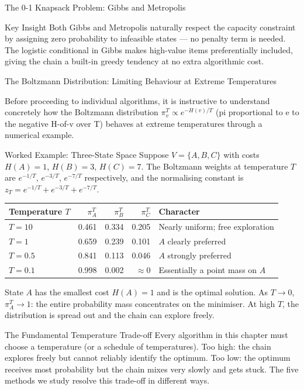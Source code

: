 \documentclass[aspectratio=169,10pt]{beamer}
\begin{document}
\begin{frame}[allowframebreaks]{The 0-1 Knapsack Problem: Gibbs and Metropolis}
\begin{alertblock}{Key Insight}
  Both Gibbs and Metropolis naturally respect the capacity constraint by
  assigning zero probability to infeasible states --- no penalty term is
  needed.  The logistic conditional in Gibbs makes high-value items
  preferentially included, giving the chain a built-in greedy tendency at no
  extra algorithmic cost.
\end{alertblock}

\end{frame}

\begin{frame}[allowframebreaks]{The Boltzmann Distribution: Limiting Behaviour at Extreme Temperatures}

Before proceeding to individual algorithms, it is instructive to understand
concretely how the Boltzmann distribution $\pi^T_v \propto e^{-H(v)/T}$
(pi proportional to e to the negative H-of-v over T) behaves at extreme
temperatures through a numerical example.

\begin{exampleblock}{Worked Example: Three-State Space}
  Suppose $V = \{A, B, C\}$ with costs $H(A) = 1$, $H(B) = 3$, $H(C) = 7$.
  The Boltzmann weights at temperature $T$ are $e^{-1/T}$, $e^{-3/T}$,
  $e^{-7/T}$ respectively, and the normalising constant is
  $z_T = e^{-1/T} + e^{-3/T} + e^{-7/T}$.

  \medskip
  \begin{tabular}{lrrrl}
    \toprule
    Temperature $T$ & $\pi^T_A$ & $\pi^T_B$ & $\pi^T_C$ & Character\\
    \midrule
    $T = 10$ & 0.461 & 0.334 & 0.205 & Nearly uniform; free exploration\\
    $T = 1$  & 0.659 & 0.239 & 0.101 & $A$ clearly preferred\\
    $T = 0.5$& 0.841 & 0.113 & 0.046 & $A$ strongly preferred\\
    $T = 0.1$& 0.998 & 0.002 & $\approx 0$ & Essentially a point mass on $A$\\
    \bottomrule
  \end{tabular}

  \medskip
  State $A$ has the smallest cost $H(A) = 1$ and is the optimal solution.
  As $T \to 0$, $\pi^T_A \to 1$: the entire probability mass concentrates
  on the minimiser.  At high $T$, the distribution is spread out and the
  chain can explore freely.
\end{exampleblock}

\begin{alertblock}{The Fundamental Temperature Trade-off}
  Every algorithm in this chapter must choose a temperature (or a schedule
  of temperatures).  Too high: the chain explores freely but cannot reliably
  identify the optimum.  Too low: the optimum receives most probability but
  the chain mixes very slowly and gets stuck.  The five methods we study
  resolve this trade-off in different ways.
\end{alertblock}

\end{frame}
\end{document}

